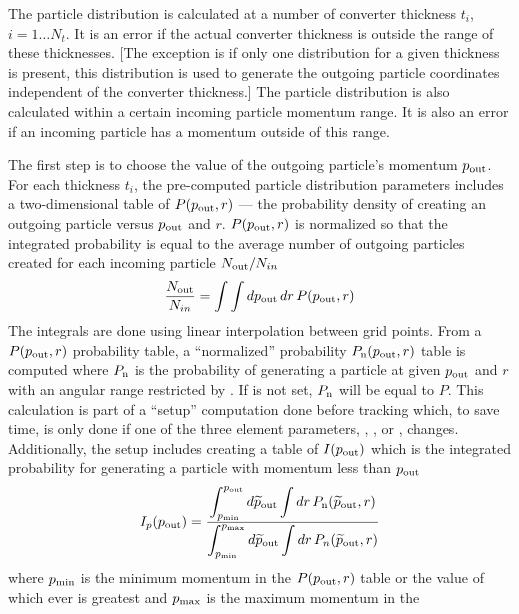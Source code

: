 The particle distribution is calculated at a number of converter thickness $t_i$, $i = 1 \ldots
N_t$. It is an error if the actual converter thickness is outside the range of these
thicknesses. [The exception is if only one distribution for a given thickness is present, this
distribution is used to generate the outgoing particle coordinates independent of the converter
thickness.]  The particle distribution is also calculated within a certain incoming particle
momentum range. It is also an error if an incoming particle has a momentum outside of this range.

The first step is to choose the value of the outgoing particle's momentum $p_{\text{out}}$. For each
thickness $t_i$, the pre-computed particle distribution parameters includes a two-dimensional table
of $P(p_{\text{out}}, r)$ --- the probability density of creating an outgoing particle versus
$p_{\text{out}}$ and $r$. $P(p_{\text{out}},r)$ is normalized so that the integrated probability is equal
to the average number of outgoing particles created for each incoming particle $N_{\text{out}}/N_{in}$
\begin{equation}
  \frac{N_{\text{out}}}{N_{in}} = \int \int dp_{\text{out}} \, dr \, P(p_{\text{out}}, r)
  \label{nnprp}
\end{equation}
The integrals are done using linear interpolation between grid points.  From a $P(p_{\text{out}},r)$
probability table, a ``normalized'' probability $P_{\text{n}}(p_{\text{out}},r)$ table is computed where
$P_{\text{n}}$ is the probability of generating a particle at given $p_{\text{out}}$ and $r$ with an
angular range restricted by . If  is not set, $P_{\text{n}}$ will
be equal to $P$.  This calculation is part of a ``setup'' computation done before tracking which, to
save time, is only done if one of the three element parameters, , , or
, changes. Additionally, the setup includes creating a table of $I(p_{\text{out}})$
which is the integrated probability for generating a particle with momentum less than $p_{\text{out}}$
\begin{equation}
  I_p(p_{\text{out}}) = \frac{\displaystyle \int_{p_{\text{min}}}^{p_{\text{out}}} d{\widetilde p}_{\text{out}} 
  \int dr \, P_{\text{n}}({\widetilde p}_{\text{out}}, r)}
  {\displaystyle \int_{p_{\text{min}}}^{p_{\text{max}}} d{\widetilde p}_{\text{out}} \int dr \, P_{n}({\widetilde p}_{\text{out}}, r)}
\end{equation}
where $p_{\text{min}}$ is the minimum momentum in the $P(p_{\text{out}}, r)$ table or the value of
 which ever is greatest and $p_{\text{max}}$ is the maximum momentum in the
